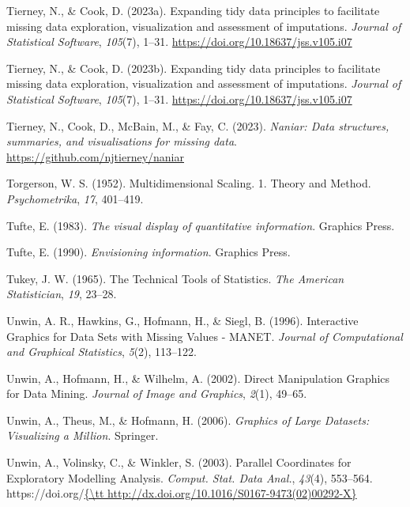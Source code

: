 \documentclass[
  letterpaper,
]{krantz}
\newlength{\cslhangindent}
\newenvironment{CSLReferences}[2] %
 {\begin{list}{}{%
  \setlength{\itemindent}{0pt}
  \setlength{\leftmargin}{0pt}
  \setlength{\parsep}{0pt}
  \ifodd #1
   \setlength{\leftmargin}{\cslhangindent}
   \setlength{\itemindent}{-1\cslhangindent}
  \fi
  \setlength{\itemsep}{#2\baselineskip}}}
 {\end{list}}
\begin{document}
\begin{CSLReferences}{1}{0}
Tierney, N., \& Cook, D. (2023a). Expanding tidy data principles to
facilitate missing data exploration, visualization and assessment of
imputations. \emph{Journal of Statistical Software}, \emph{105}(7),
1--31. \url{https://doi.org/10.18637/jss.v105.i07}

Tierney, N., \& Cook, D. (2023b). Expanding tidy data principles to
facilitate missing data exploration, visualization and assessment of
imputations. \emph{Journal of Statistical Software}, \emph{105}(7),
1--31. \url{https://doi.org/10.18637/jss.v105.i07}

Tierney, N., Cook, D., McBain, M., \& Fay, C. (2023). \emph{Naniar: Data
structures, summaries, and visualisations for missing data}.
\url{https://github.com/njtierney/naniar}

Torgerson, W. S. (1952). Multidimensional {S}caling. 1. {T}heory and
{M}ethod. \emph{Psychometrika}, \emph{17}, 401--419.

Tufte, E. (1983). \emph{The visual display of quantitative information}.
Graphics Press.

Tufte, E. (1990). \emph{Envisioning information}. Graphics Press.

Tukey, J. W. (1965). The {T}echnical {T}ools of {S}tatistics. \emph{The
American Statistician}, \emph{19}, 23--28.

Unwin, A. R., Hawkins, G., Hofmann, H., \& Siegl, B. (1996).
{I}nteractive {G}raphics for {D}ata {S}ets with {M}issing {V}alues -
{MANET}. \emph{Journal of Computational and Graphical Statistics},
\emph{5}(2), 113--122.

Unwin, A., Hofmann, H., \& Wilhelm, A. (2002). Direct {M}anipulation
{G}raphics for {D}ata {M}ining. \emph{Journal of Image and Graphics},
\emph{2}(1), 49--65.

Unwin, A., Theus, M., \& Hofmann, H. (2006). \emph{Graphics of {L}arge
{D}atasets: {V}isualizing a {M}illion}. Springer.

Unwin, A., Volinsky, C., \& Winkler, S. (2003). Parallel {C}oordinates
for {E}xploratory {M}odelling {A}nalysis. \emph{Comput. Stat. Data
Anal.}, \emph{43}(4), 553--564.
https://doi.org/\href{\%7B/tt\%20http://dx.doi.org/10.1016/S0167-9473(02)00292-X\%7D}{\{\textbackslash tt
http://dx.doi.org/10.1016/S0167-9473(02)00292-X\}}


\end{CSLReferences}
\end{document}
